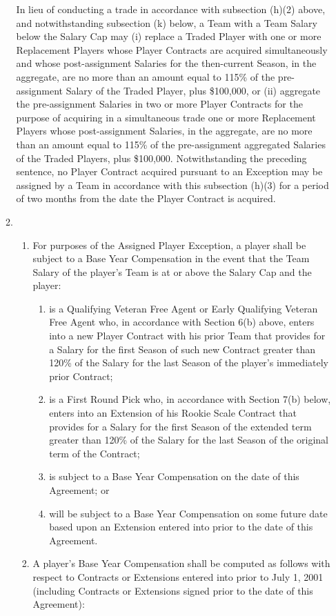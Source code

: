 \documentclass[
]{book}
\providecommand{\tightlist}{%
  \setlength{\itemsep}{0pt}\setlength{\parskip}{0pt}}
\begin{document}
\begin{enumerate}
\begin{enumerate}
    In lieu of conducting a trade in accordance with subsection (h)(2) above, and notwithstanding subsection (k) below, a Team with a Team Salary below the Salary Cap may (i) replace a Traded Player with one or more Replacement Players whose Player Contracts are acquired simultaneously and whose post-assignment Salaries for the then-current Season, in the aggregate, are no more than an amount equal to 115\% of the pre-assignment Salary of the Traded Player, plus \$100,000, or (ii) aggregate the pre-assignment Salaries in two or more Player Contracts for the purpose of acquiring in a simultaneous trade one or more Replacement Players whose post-assignment Salaries, in the aggregate, are no more than an amount equal to 115\% of the pre-assignment aggregated Salaries of the Traded Players, plus \$100,000. Notwithstanding the preceding sentence, no Player Contract acquired pursuant to an Exception may be assigned by a Team in accordance with this subsection (h)(3) for a period of two months from the date the Player Contract is acquired.
  \item
    \begin{enumerate}
    \def\labelenumiii{(\roman{enumiii})}
    \tightlist
    \item
      For purposes of the Assigned Player Exception, a player shall be subject to a Base Year Compensation in the event that the Team Salary of the player's Team is at or above the Salary Cap and the player:

      \begin{enumerate}
      \def\labelenumiv{(\Alph{enumiv})}
      \tightlist
      \item
        is a Qualifying Veteran Free Agent or Early Qualifying Veteran Free Agent who, in accordance with Section 6(b) above, enters into a new Player Contract with his prior Team that provides for a Salary for the first Season of such new Contract greater than 120\% of the Salary for the last Season of the player's immediately prior Contract;
      \item
        is a First Round Pick who, in accordance with Section 7(b) below, enters into an Extension of his Rookie Scale Contract that provides for a Salary for the first Season of the extended term greater than 120\% of the Salary for the last Season of the original term of the Contract;
      \item
        is subject to a Base Year Compensation on the date of this Agreement; or
      \item
        will be subject to a Base Year Compensation on some future date based upon an Extension entered into prior to the date of this Agreement.
      \end{enumerate}
    \item
      A player's Base Year Compensation shall be computed as follows with respect to Contracts or Extensions entered into prior to July 1, 2001 (including Contracts or Extensions signed prior to the date of this Agreement):


\end{enumerate}
\end{enumerate}
\end{enumerate}
\end{document}
